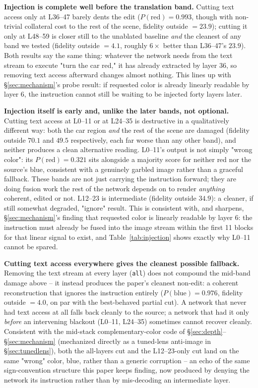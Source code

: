 \documentclass[10pt,twocolumn,letterpaper]{article}
\begin{document}
\textbf{Injection is complete well before the translation band.} Cutting
text access only at L36--47 barely dents the edit ($P(\text{red})=0.993$,
though with non-trivial collateral cost to the rest of the scene, fidelity
outside $=23.9$); cutting it only at L48--59 is closer still to the
unablated baseline \emph{and} the cleanest of any band we tested
(fidelity outside $=4.1$, roughly $6\times$ better than L36--47's $23.9$).
Both results say the same thing: whatever the network needs from the text
stream to execute "turn the car red," it has already extracted by layer
36, so removing text access afterward changes almost nothing. This lines
up with \S\ref{sec:mechanism}'s probe result: if requested color is
already linearly readable by layer 6, the instruction cannot still be
waiting to be injected forty layers later.

\textbf{Injection itself is early and, unlike the later bands, not
optional.} Cutting text access at L0--11 or at L24--35 is destructive in a
qualitatively different way: both the car region \emph{and} the rest of
the scene are damaged (fidelity outside $70.1$ and $49.5$ respectively,
each far worse than any other band), and neither produces a clean
alternative reading. L0--11's output is not simply "wrong color": its
$P(\text{red})=0.321$ sits alongside a majority score for neither red nor
the source's blue, consistent with a genuinely garbled image rather than
a graceful fallback. These bands are not just carrying the instruction
forward; they are doing fusion work the rest of the network depends on to
render \emph{anything} coherent, edited or not. L12--23 is intermediate
(fidelity outside $34.9$): a cleaner, if still somewhat degraded, "ignore"
result. This is consistent with, and sharpens, \S\ref{sec:mechanism}'s
finding that requested color is linearly readable by layer 6: the instruction
must already be fused into the image stream within the first 11 blocks
for that linear signal to exist, and Table~\ref{tab:injection}
shows exactly why L0--11 cannot be spared.

\textbf{Cutting text access everywhere gives the cleanest possible
fallback.} Removing the text stream at every layer (\texttt{all}) does not
compound the mid-band damage above -- it instead produces the paper's
cleanest non-edit: a coherent reconstruction that ignores the instruction
entirely ($P(\text{blue})=0.976$, fidelity outside $=4.0$, on par with the
best-behaved partial cut). A network that never had text access at all
falls back cleanly to the source; a network that had it only \emph{before}
an intervening blackout (L0--11, L24--35) sometimes cannot recover
cleanly. Consistent with the mid-stack complementary-color code of
\S\ref{sec:depth}--\S\ref{sec:mechanism} (mechanized directly as a
tuned-lens anti-image in \S\ref{sec:tunedlens}), both the all-layers cut
and the L12--23-only cut land on the same "wrong" color, blue, rather
than a generic corruption -- an echo of the same sign-convention
structure this paper keeps finding, now produced by denying the network
its instruction rather than by mis-decoding an intermediate layer.
\end{document}
